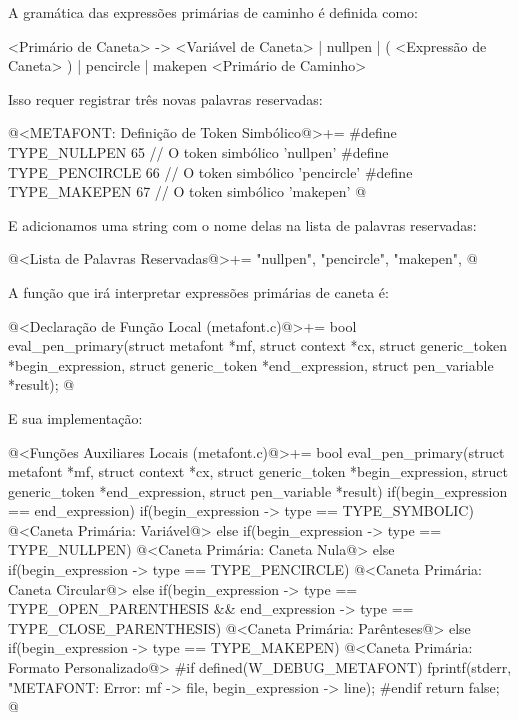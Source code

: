 {

A gramática das expressões primárias de caminho é definida como:

\alinhaverbatim
<Primário de Caneta> -> <Variável de Caneta> |
                        nullpen | ( <Expressão de Caneta> ) |
                        pencircle | makepen <Primário de Caminho>
\alinhanormal


Isso requer registrar três novas palavras reservadas:

\iniciocodigo
@<METAFONT: Definição de Token Simbólico@>+=
#define TYPE_NULLPEN        65 // O token simbólico 'nullpen'
#define TYPE_PENCIRCLE      66 // O token simbólico 'pencircle'
#define TYPE_MAKEPEN        67 // O token simbólico 'makepen'
@
\fimcodigo

E adicionamos uma string com o nome delas na lista de palavras
reservadas:

\iniciocodigo
@<Lista de Palavras Reservadas@>+=
"nullpen", "pencircle", "makepen",
@
\fimcodigo

A função que irá interpretar expressões primárias de caneta é:

\iniciocodigo
@<Declaração de Função Local (metafont.c)@>+=
bool eval_pen_primary(struct metafont *mf, struct context *cx,
                      struct generic_token *begin_expression,
                      struct generic_token *end_expression,
                      struct pen_variable *result);
@
\fimcodigo

E sua implementação:

\iniciocodigo
@<Funções Auxiliares Locais (metafont.c)@>+=
bool eval_pen_primary(struct metafont *mf, struct context *cx,
                      struct generic_token *begin_expression,
                      struct generic_token *end_expression,
                      struct pen_variable *result){
  if(begin_expression == end_expression){
    if(begin_expression -> type == TYPE_SYMBOLIC){
      @<Caneta Primária: Variável@>
    }
    else if(begin_expression -> type == TYPE_NULLPEN){
      @<Caneta Primária: Caneta Nula@>
    }
    else if(begin_expression -> type == TYPE_PENCIRCLE){
      @<Caneta Primária: Caneta Circular@>
    }
  }
  else{
    if(begin_expression -> type == TYPE_OPEN_PARENTHESIS &&
      end_expression -> type == TYPE_CLOSE_PARENTHESIS){
      @<Caneta Primária: Parênteses@>
    }
    else if(begin_expression -> type == TYPE_MAKEPEN){
      @<Caneta Primária: Formato Personalizado@>
    }
  }
#if defined(W_DEBUG_METAFONT)
  fprintf(stderr, "METAFONT: Error: %
          mf -> file, begin_expression -> line);
#endif
  return false;
}
@
\fimcodigo

}
